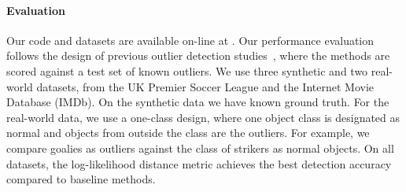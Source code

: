 \documentclass[conference]{IEEEtran}
\begin{document}
%
%
\paragraph{Evaluation} Our code and datasets are available on-line at \cite{url}.
Our performance evaluation follows the design of previous outlier detection studies~\cite{Gao2010,aggarwal2013},
where the methods are scored against a test set of known outliers.  
%
We use three synthetic and two real-world datasets, from the UK Premier Soccer League and the Internet Movie Database (IMDb). On the synthetic data we have known ground truth. For the real-world data, we use a one-class design, where one object class is designated as normal and objects from outside the class are the outliers. For example, we compare goalies as outliers against the class of strikers as normal objects. 
On all datasets, the log-likelihood distance metric achieves the best detection accuracy compared to baseline methods. 
\end{document}
